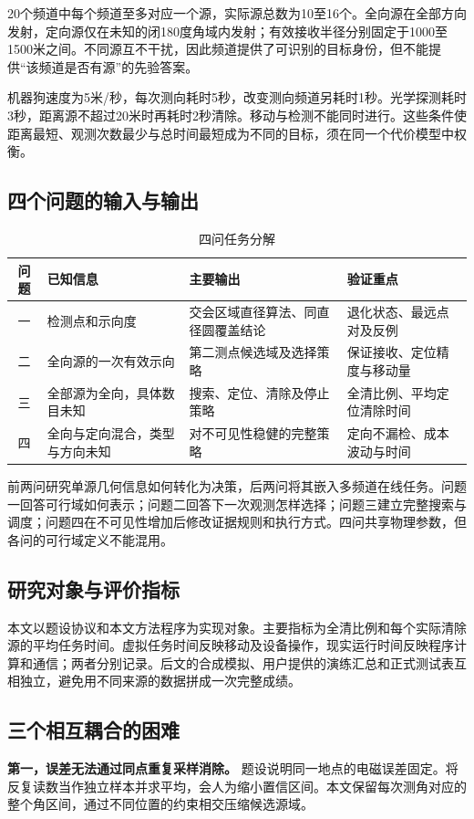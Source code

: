 \documentclass[UTF8,a4paper,12pt,fontset=fandol]{ctexart}
\newcommand{\nextpage}{\clearpage}
\begin{document}
20个频道中每个频道至多对应一个源，实际源总数为10至16个。全向源在全部方向发射，定向源仅在未知的闭180度角域内发射；有效接收半径分别固定于1000至1500米之间。不同源互不干扰，因此频道提供了可识别的目标身份，但不能提供“该频道是否有源”的先验答案。

机器狗速度为5米/秒，每次测向耗时5秒，改变测向频道另耗时1秒。光学探测耗时3秒，距离源不超过20米时再耗时2秒清除。移动与检测不能同时进行。这些条件使距离最短、观测次数最少与总时间最短成为不同的目标，须在同一个代价模型中权衡。

\subsection{四个问题的输入与输出}
\begin{table}[H]\centering\caption{四问任务分解}\small
\begin{tabularx}{\linewidth}{cYYY}\toprule
问题 & 已知信息 & 主要输出 & 验证重点\\\midrule
一 & 检测点和示向度 & 交会区域直径算法、同直径圆覆盖结论 & 退化状态、最远点对及反例\\
二 & 全向源的一次有效示向 & 第二测点候选域及选择策略 & 保证接收、定位精度与移动量\\
三 & 全部源为全向，具体数目未知 & 搜索、定位、清除及停止策略 & 全清比例、平均定位清除时间\\
四 & 全向与定向混合，类型与方向未知 & 对不可见性稳健的完整策略 & 定向不漏检、成本波动与时间\\\bottomrule
\end{tabularx}\end{table}

前两问研究单源几何信息如何转化为决策，后两问将其嵌入多频道在线任务。问题一回答可行域如何表示；问题二回答下一次观测怎样选择；问题三建立完整搜索与调度；问题四在不可见性增加后修改证据规则和执行方式。四问共享物理参数，但各问的可行域定义不能混用。

\subsection{研究对象与评价指标}
本文以题设协议和本文方法程序为实现对象\cite{interface}。主要指标为全清比例和每个实际清除源的平均任务时间。虚拟任务时间反映移动及设备操作，现实运行时间反映程序计算和通信；两者分别记录。后文的合成模拟、用户提供的演练汇总和正式测试表互相独立，避免用不同来源的数据拼成一次完整成绩。

\nextpage
\subsection{三个相互耦合的困难}
\textbf{第一，误差无法通过同点重复采样消除。} 题设说明同一地点的电磁误差固定。将反复读数当作独立样本并求平均，会人为缩小置信区间。本文保留每次测角对应的整个角区间，通过不同位置的约束相交压缩候选源域。
\end{document}

